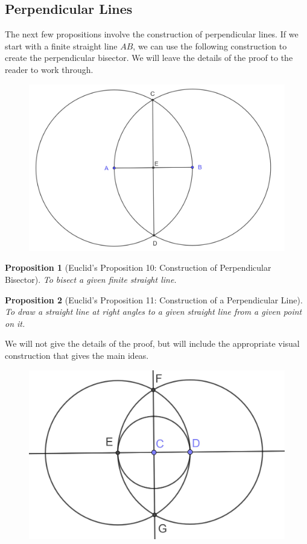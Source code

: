 \documentclass[
]{book}
\newtheorem{proposition}{Proposition}[chapter]
\theoremstyle{definition}
\theoremstyle{definition}
\theoremstyle{definition}
\theoremstyle{definition}
\theoremstyle{remark}
\begin{document}
\hypertarget{perpendicular-lines}{%
\subsection{Perpendicular Lines}\label{perpendicular-lines}}

The next few propositions involve the construction of perpendicular lines. If we start with a finite straight line \(AB\), we can use the following construction to create the perpendicular bisector. We will leave the details of the proof to the reader to work through.

\begin{figure}

{\centering \includegraphics[width=0.6\linewidth]{images/Prop10} 

}

\end{figure}

\begin{proposition}[Euclid's Proposition 10: Construction of Perpendicular Bisector]
\protect\hypertarget{prp:prop10}{}\label{prp:prop10}To bisect a given finite straight line.
\end{proposition}

\begin{proposition}[Euclid's Proposition 11: Construction of a Perpendicular Line]
\protect\hypertarget{prp:prop11}{}\label{prp:prop11}To draw a straight line at right angles to a given straight line from a given point on it.
\end{proposition}

We will not give the details of the proof, but will include the appropriate visual construction that gives the main ideas.

\begin{figure}

{\centering \includegraphics[width=0.45\linewidth]{images/Prop11} 

}

\end{figure}
\end{document}
